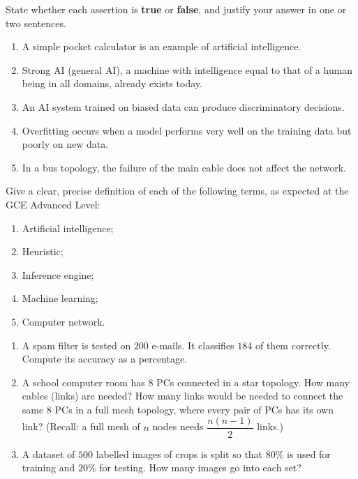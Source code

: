 \documentclass[11pt]{article}
\begin{document}
\begin{exercice}
State whether each assertion is \textbf{true} or \textbf{false}, and justify your answer in one or two sentences.
\begin{enumerate}
\item A simple pocket calculator is an example of artificial intelligence.
\item Strong AI (general AI), a machine with intelligence equal to that of a human being in all domains, already exists today.
\item An AI system trained on biased data can produce discriminatory decisions.
\item Overfitting occurs when a model performs very well on the training data but poorly on new data.
\item In a bus topology, the failure of the main cable does not affect the network.
\end{enumerate}
\end{exercice}

\begin{exercice}[Definitions]
Give a clear, precise definition of each of the following terms, as expected at the GCE Advanced Level:
\begin{enumerate}
\item Artificial intelligence;
\item Heuristic;
\item Inference engine;
\item Machine learning;
\item Computer network.
\end{enumerate}
\end{exercice}

\begin{exercice}
\begin{enumerate}
\item A spam filter is tested on $200$ e-mails. It classifies $184$ of them correctly. Compute its accuracy as a percentage.
\item A school computer room has $8$ PCs connected in a star topology. How many cables (links) are needed? How many links would be needed to connect the same $8$ PCs in a full mesh topology, where every pair of PCs has its own link? (Recall: a full mesh of $n$ nodes needs $\dfrac{n(n-1)}{2}$ links.)
\item A dataset of $500$ labelled images of crops is split so that $80\%$ is used for training and $20\%$ for testing. How many images go into each set?
\end{enumerate}
\end{exercice}
\end{document}
